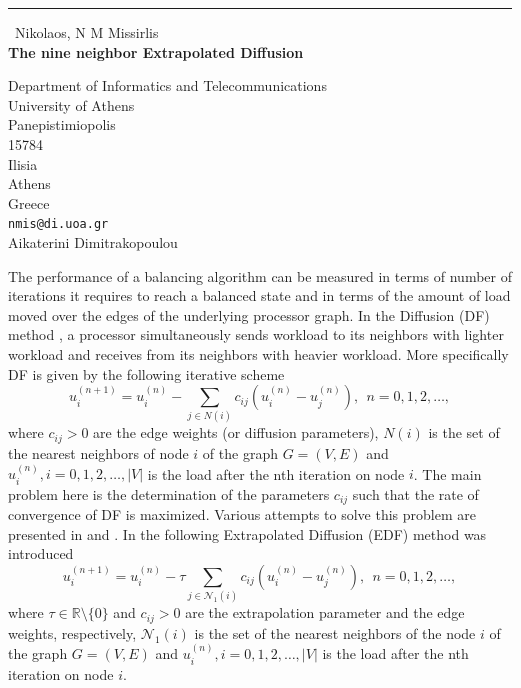\documentclass{report}
\begin{document}
\begin{center}
\rule{6in}{1pt} \
{\large Nikolaos, N M Missirlis \\
{\bf The nine neighbor Extrapolated Diffusion}}

Department of Informatics and Telecommunications \\ University of Athens \\ Panepistimiopolis \\ 15784 \\ Ilisia \\ Athens \\ Greece
\\
{\tt nmis@di.uoa.gr}\\
Aikaterini Dimitrakopoulou\end{center}

The performance of a balancing algorithm can
be measured in terms of number of iterations it requires to reach a
balanced state and in terms of the amount of load moved over the
edges of the underlying processor graph. In the Diffusion (DF)
method \cite{Cybe89}, \cite{Boil90} a processor simultaneously sends
workload to its neighbors with lighter workload and receives from
its neighbors with heavier workload.
More specifically DF is given by the
following iterative scheme
\begin{equation}
u^{(n+1)}_i = u^{(n)}_i - \sum_{j \in N(i)} c_{ij} (u^{(n)}_i-
u^{(n)}_j),\ \ n=0,1,2, \dots, \label{It:000}
\end{equation}
where $c_{ij} > 0$ are the edge weights (or diffusion parameters),
$N(i)$ is the set of the nearest neighbors of node $i$ of the graph
$G=(V,E)$ and $u^{(n)}_i, i=0,1,2, \dots,|V| $ is the load after the
nth iteration on node $i$. The main problem here is the
determination of the parameters $c_{ij}$ such that the rate of
convergence of DF is maximized.
Various attempts to solve this problem are presented in
\cite{Cybe89,Hong88,Diek97,Elsa04} and \cite{Xu97}.
In \cite{Kara04} the following Extrapolated Diffusion (EDF) method was introduced
\begin{equation}
u^{(n+1)}_i = u^{(n)}_i - \tau \sum_{j \in\mathcal{N}_1(i)} c_{ij} (u^{(n)}_i-
u^{(n)}_j),\ \ n=0,1,2, \dots, \label{It:00}
\end{equation}
where $\tau\in\mathbb{R}\setminus\{0\}$ and $c_{ij} > 0$ are the
extrapolation parameter and the edge weights,
respectively, $\mathcal{N}_1(i)$ is the set of the nearest neighbors of
the node $i$ of the graph $G=(V,E)$ and $u^{(n)}_i, i=0,1,2, \dots,|V| $
is the load after the
nth iteration on node $i$.
\end{document}
